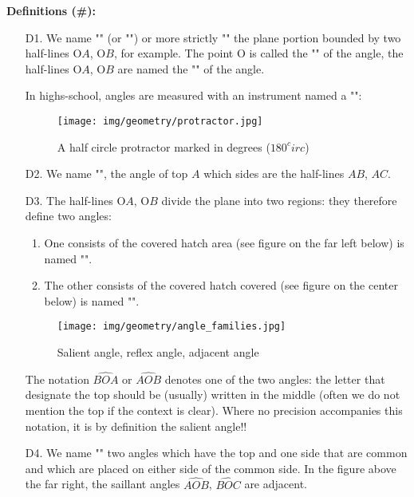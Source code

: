 	\textbf{Definitions (\#\mydef):}
	\begin{enumerate}
		\item[D1.] We name "" (or "") or more strictly "" the plane portion bounded by two half-lines O$A$, O$B$, for example. The point O is called the "" of the angle, the half-lines O$A$, O$B$ are named the "" of the angle.

		In highs-school, angles are measured with an instrument named a "":
		
		\begin{figure}[H]
			\centering
			\texttt{[image: img/geometry/protractor.jpg]}
			\caption{A half circle protractor marked in degrees ($180^circ$)}
		\end{figure}

		\item[D2.] We name "", the angle of top $A$ which sides are the half-lines $AB$, $AC$.

		\item[D3.] The half-lines O$A$, O$B$ divide the plane into two regions: they therefore define two angles:
		\begin{enumerate}
			\item One consists of the covered hatch area (see figure on the far left below) is named "".
	
			\item The other consists of the covered hatch covered (see figure on the center below) is named "".
		\end{enumerate}
		\begin{figure}[H]
			\centering
			\texttt{[image: img/geometry/angle\_families.jpg]}
			\caption{Salient angle, reflex angle, adjacent angle}
		\end{figure}
		The notation $\widehat{BOA}$ or $\widehat{AOB}$ denotes one of the two angles: the letter that designate the top should be (usually) written in the middle (often we do not mention the top if the context is clear). Where no precision accompanies this notation, it is by definition the salient angle!!

		\item[D4.] We name "" two angles which have the top and one side that are common and which are placed on either side of the common side. In the figure above the far right, the saillant angles $\widehat{AOB}$, $\widehat{BOC}$ are adjacent.
		

\end{enumerate}
